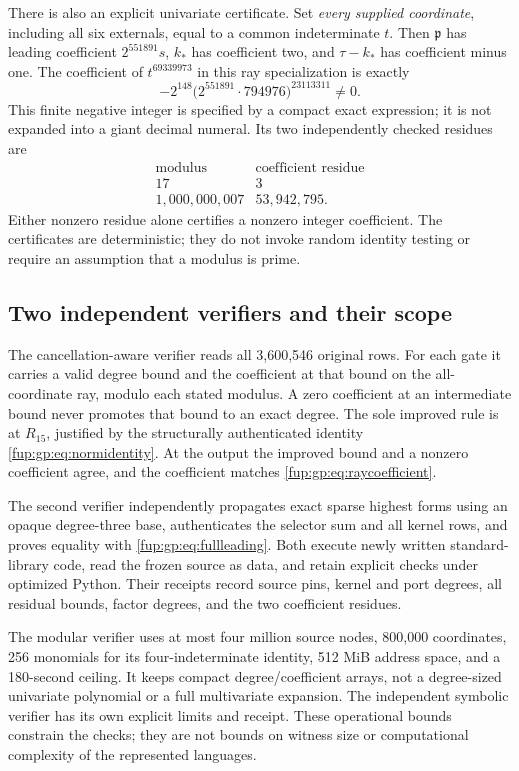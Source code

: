 \documentclass[11pt,letterpaper]{article}
\theoremstyle{definition}\newtheorem{definition}[theorem]{Definition}
\theoremstyle{remark}\newtheorem{remark}[theorem]{Remark}
\begin{document}
There is also an explicit univariate certificate. Set \emph{every supplied coordinate}, including all six externals, equal to a common indeterminate $t$. Then $\mathfrak p$ has leading coefficient $2^{551891}s$, $k_*$ has coefficient two, and $\tau-k_*$ has coefficient minus one. The coefficient of $t^{69339973}$ in this ray specialization is exactly
\begin{equation}\label{fup:gp:eq:raycoefficient}
 -2^{148}\bigl(2^{551891}\cdot794976\bigr)^{23113311}\ne0.
\end{equation}
This finite negative integer is specified by a compact exact expression; it is not expanded into a giant decimal numeral. Its two independently checked residues are
\[
\begin{array}{c|r}
\text{modulus}&\text{coefficient residue}\\\hline
17&3\\
1,000,000,007&53,942,795.
\end{array}
\]
Either nonzero residue alone certifies a nonzero integer coefficient. The certificates are deterministic; they do not invoke random identity testing or require an assumption that a modulus is prime.

\subsection{Two independent verifiers and their scope}
The cancellation-aware verifier reads all 3,600,546 original rows. For each gate it carries a valid degree bound and the coefficient at that bound on the all-coordinate ray, modulo each stated modulus. A zero coefficient at an intermediate bound never promotes that bound to an exact degree. The sole improved rule is at $R_{15}$, justified by the structurally authenticated identity \eqref{fup:gp:eq:normidentity}. At the output the improved bound and a nonzero coefficient agree, and the coefficient matches \eqref{fup:gp:eq:raycoefficient}.

The second verifier independently propagates exact sparse highest forms using an opaque degree-three base, authenticates the selector sum and all kernel rows, and proves equality with \eqref{fup:gp:eq:fullleading}. Both execute newly written standard-library code, read the frozen source as data, and retain explicit checks under optimized Python. Their receipts record source pins, kernel and port degrees, all residual bounds, factor degrees, and the two coefficient residues.

The modular verifier uses at most four million source nodes, 800,000 coordinates, 256 monomials for its four-indeterminate identity, 512 MiB address space, and a 180-second ceiling. It keeps compact degree/coefficient arrays, not a degree-sized univariate polynomial or a full multivariate expansion. The independent symbolic verifier has its own explicit limits and receipt. These operational bounds constrain the checks; they are not bounds on witness size or computational complexity of the represented languages.
\end{document}
